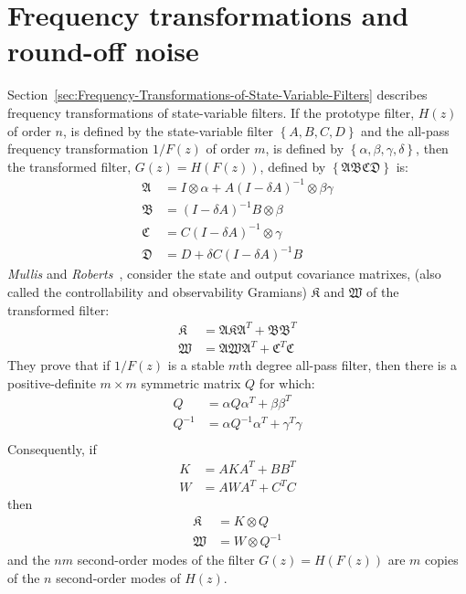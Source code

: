 \documentclass[a4paper,twoside,10pt,english]{report}
\begin{document}
\section{\label{sec:Frequency-transformations-and-round-off-noise}Frequency transformations and round-off noise}
Section~\ref{sec:Frequency-Transformations-of-State-Variable-Filters} describes
frequency transformations of state-variable filters. If the prototype filter,
$H\left(z\right)$ of order $n$, is defined by the state-variable filter 
$\left\{A,B,C,D\right\}$ and the all-pass frequency transformation
$1/F\left(z\right)$ of order $m$, is defined by
 $\left\{\alpha,\beta,\gamma,\delta\right\}$, then the transformed filter,
$G\left(z\right)=H\left(F\left(z\right)\right)$, defined by
$\left\{\mathfrak{A}\mathfrak{B}\mathfrak{C}\mathfrak{D}\right\}$ is:
\begin{align*}
\mathfrak{A} &= I\otimes\alpha+A\left(I-\delta A\right)^{-1}\otimes\beta\gamma\\
\mathfrak{B} &= \left(I-\delta A\right)^{-1}B\otimes\beta\\
\mathfrak{C} &= C\left(I-\delta A\right)^{-1}\otimes\gamma\\
\mathfrak{D} &= D+\delta C\left(I-\delta A\right)^{-1}B
\end{align*}
\emph{Mullis} and \emph{Roberts}~\cite[Section III]
{MullisRoberts_RoundoffNoiseInDigitalFiltersFrequencyTransformations},
consider the state and output covariance matrixes, (also called the 
controllability and observability Gramians) $\mathfrak{K}$ and $\mathfrak{W}$ of
the transformed filter:
\begin{align*}
\mathfrak{K}&=\mathfrak{A}\mathfrak{K}\mathfrak{A}^{T}+
              \mathfrak{B}\mathfrak{B}^{T}\\
\mathfrak{W}&=\mathfrak{A}\mathfrak{W}\mathfrak{A}^{T}+
              \mathfrak{C}^{T}\mathfrak{C}
\end{align*}
They prove that if $1/F\left(z\right)$ is a stable $m$th
degree all-pass filter, then there is a positive-definite $m\times{}m$
symmetric matrix $Q$ for which:
\begin{align*}
Q&=\alpha{}Q\alpha^{T}+\beta\beta^{T}\\
Q^{-1}&=\alpha{}Q^{-1}\alpha^{T}+\gamma^{T}\gamma\\
\end{align*}
Consequently, if
\begin{align*}
K&=AKA^{T}+BB^{T}\\
W&=AWA^{T}+C^{T}C
\end{align*}
then
\begin{align}
\mathfrak{K}&=K\otimes{}Q \\
\mathfrak{W}&=W\otimes{}Q^{-1}
\label{eqn:Frequency-transformations-and-round-off-noise-K-W-Q}
\end{align}
and the $nm$ second-order modes of the filter 
$G\left(z\right)=H\left(F\left(z\right)\right)$ are $m$ copies of the $n$
second-order modes of $H\left(z\right)$.
\cleardoublepage{}
\end{document}
